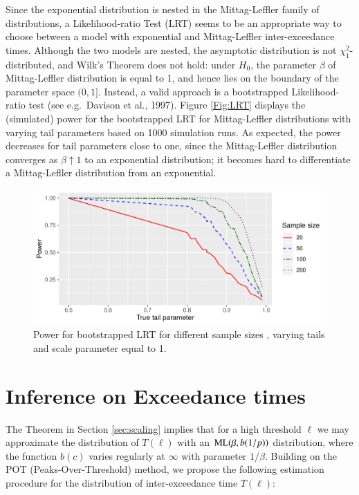 \documentclass[]{elsarticle} %
\begin{document}
Since the exponential distribution is nested in the Mittag-Leffler
family of distributions, a Likelihood-ratio Test (LRT) seems to be an
appropriate way to choose between a model with exponential and
Mittag-Leffler inter-exceedance times. Although the two models are
nested, the asymptotic distribution is not \(\chi^2_1\)-distributed, and
Wilk's Theorem does not hold: under \(H_0\), the parameter \(\beta\) of
Mittag-Leffler distribution is equal to \(1\), and hence lies on the
boundary of the parameter space \((0,1]\). Instead, a valid approach is
a bootstrapped Likelihood-ratio test (see e.g.~Davison et al., 1997).
Figure \ref{Fig:LRT} displays the (simulated) power for the bootstrapped
LRT for Mittag-Leffler distributions with varying tail parameters based
on 1000 simulation runs. As expected, the power decreases for tail
parameters close to one, since the Mittag-Leffler distribution converges
as \(\beta \uparrow 1\) to an exponential distribution; it becomes hard
to differentiate a Mittag-Lefller distribution from an exponential.

\begin{figure}

{\centering \includegraphics[width=0.9\linewidth]{article_springer_files/figure-latex/LRT_power-1} 

}

\caption{\label{Fig:LRT} Power for bootstrapped LRT for different sample sizes , varying tails and scale parameter equal to 1.}\label{fig:LRT_power}
\end{figure}

\hypertarget{inference-on-exceedance-times}{%
\section{Inference on Exceedance
times}\label{inference-on-exceedance-times}}

The Theorem in Section \ref{sec:scaling} implies that for a high
threshold \(\ell\) we may approximate the distribution of \(T(\ell)\)
with an \({\rm ML}(\beta, b(1/p))\) distribution, where the function
\(b(c)\) varies regularly at \(\infty\) with parameter \(1/\beta\).
Building on the POT (Peaks-Over-Threshold) method, we propose the
following estimation procedure for the distribution of inter-exceedance
time \(T(\ell)\):
\end{document}
